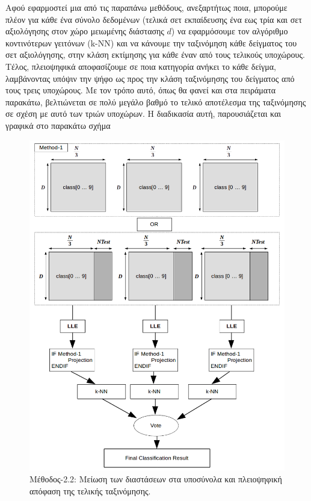 \par
Αφού εφαρμοστεί μια από τις παραπάνω μεθόδους, ανεξαρτήτως ποια, μπορούμε πλέον για κάθε ένα σύνολο δεδομένων (τελικά σετ εκπαίδευσης ένα εως τρία και σετ αξιολόγησης στον χώρο μειωμένης διάστασης $d$) να εφαρμόσουμε τον αλγόριθμο κοντινότερων γειτόνων \textlatin{(k-NN)} και να κάνουμε την ταξινόμηση κάθε δείγματος του σετ αξιολόγησης, στην κλάση εκτίμησης για κάθε έναν από τους τελικούς υποχώρους. Τέλος, πλειοψηφικά αποφασίζουμε σε ποια κατηγορία ανήκει το κάθε δείγμα, λαμβάνοντας υπόψιν την ψήφο ως προς την κλάση ταξινόμησης του δείγματος από τους τρεις υποχώρους. Με τον τρόπο αυτό, όπως θα φανεί και στα πειράματα παρακάτω, βελτιώνεται σε πολύ μεγάλο βαθμό το τελικό αποτέλεσμα της ταξινόμησης σε σχέση με αυτό των τριών υποχώρων. Η διαδικασία αυτή, παρουσιάζεται και γραφικά στο παρακάτω σχήμα
\newpage
\begin{figure}[t!]
\centering
\includegraphics[scale=0.8]{figs/7.png}
\newline
\caption{ Μέθοδος-2.2: Μείωση των διαστάσεων στα υποσύνολα και πλειοψηφική απόφαση της τελικής ταξινόμησης. } 
\end{figure}
\newpage
